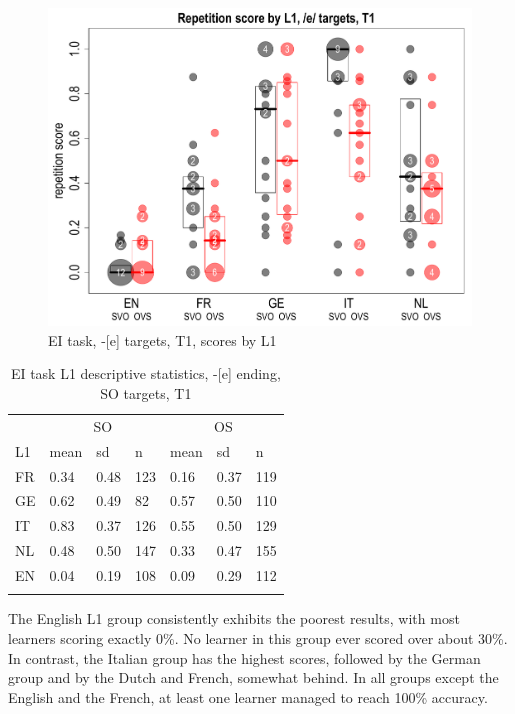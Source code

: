 \begin{figure}
    \includegraphics[width=.9\textwidth]{figures/04-1.pdf}
    \caption{EI task, -[e] targets, T1, scores by L1}
    \label{fig:04:1}
\end{figure}

\begin{table}
    \begin{tabularx}{\textwidth}{XXXXXXX}
    \lsptoprule
     & \multicolumn{3}{c}{ SO} & \multicolumn{3}{c}{ OS}\\
    L1& mean & sd & n & mean & sd & n\\
    \cmidrule{2-7}
    FR & 0.34 & 0.48 & 123 & 0.16 & 0.37 & 119\\
    GE & 0.62 & 0.49 & 82 & 0.57 & 0.50 & 110\\
    IT & 0.83 & 0.37 & 126 & 0.55 & 0.50 & 129\\
    NL & 0.48 & 0.50 & 147 & 0.33 & 0.47 & 155\\
    EN & 0.04 & 0.19 & 108 & 0.09 & 0.29 & 112\\
    \lspbottomrule
    \end{tabularx}
    \caption{EI task L1 descriptive statistics, -[e] ending, SO targets, T1}
    \label{tab:04:1}
    \label{tab:03:1}
\end{table}
\newpage

The English L1 group consistently exhibits the poorest results, with most learners scoring exactly 0\%. No learner in this group ever scored over about 30\%. In contrast, the Italian group has the highest scores, followed by the German group and by the Dutch and French, somewhat behind. In all groups except the English and the French, at least one learner managed to reach 100\% accuracy. 

